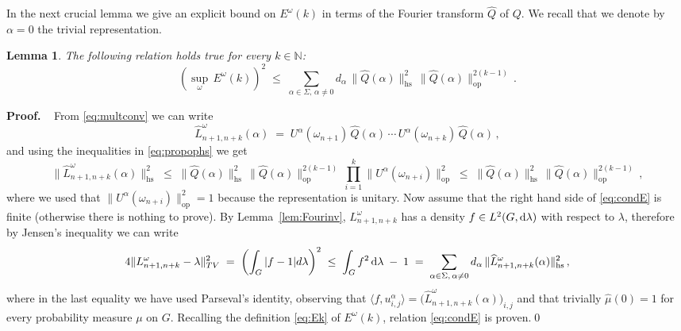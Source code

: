\documentclass[a4paper,reqno,11pt]{amsart}
\numberwithin{equation}{section}
\newtheorem{lemma}[theorem]{Lemma}
\newcommand{\ga}{\alpha}
\newcommand{\gl}{\lambda}
\newcommand{\go}{\omega}
\newcommand{\dd}{\text{\rm d}}             %
\newcommand{\N}{\mathbb{N}}
\def\proof{\noindent\textbf{Proof.} \ }
\newcommand{\somb}{\widehat} %
\begin{document}
In the next crucial lemma we give an explicit bound on $E^\go(k)$
in terms of the Fourier transform $\somb Q$ of $Q$.
We recall that we denote by $\ga = 0$ the trivial representation.

\smallskip
\begin{lemma} \label{lem:crucial}
The following relation holds true for every $k \in \N$:
\begin{equation} \label{eq:condE}
	\left( \sup_\go \, E^\go(k) \right)^2
	\;\le\; \sum_{\alpha \in \Sigma, \, \alpha \ne 0}
	d_{\alpha} \,  \|\somb Q(\alpha)\|_{\mathrm{hs}}^{2} \,
	\|\somb Q(\alpha)\|_{\mathrm{op}}^{2(k-1)} \,.
\end{equation}
\end{lemma}
\smallskip

\proof
From \eqref{eq:multconv} we can write
\begin{equation} \label{eq:mydec}
\somb L^\go_{n+1,n+k}(\alpha) \;=\;
U^\alpha(\go_{n+1}) \, \somb Q(\alpha) \,\cdots \,
U^\alpha(\go_{n+k}) \, \somb Q(\alpha)\,,
\end{equation}
and using the inequalities in \eqref{eq:propophs} we get
\begin{equation}
\|\somb L^\go_{n+1,n+k}(\alpha)\|^2_{\mathrm{hs}} \;\le\;
\|\somb Q(\alpha) \|^{2}_{\mathrm{hs}} \,
\|\somb Q(\alpha) \|^{2(k-1)}_{\mathrm{op}} \,
\prod_{i=1}^k \| U^\alpha(\omega_{n+i} ) \|^2_{\mathrm{op}}
\;\le\; \|\somb Q(\alpha) \|^{2}_{\mathrm{hs}} \,
\|\somb Q(\alpha) \|^{2(k-1)}_{\mathrm{op}} \,,
\end{equation}
where we used that $\| U^\alpha(\go_{n+i} )\|^2_{\mathrm{op}} = 1$
because the representation is unitary.
Now assume that the right hand side of \eqref{eq:condE} is finite
(otherwise there is nothing to prove). By Lemma~\ref{lem:Fourinv},
$L^\go_{n+1,n+k}$ has a density
$f \in L^2(G, \dd\gl)$ with respect to $\lambda$, therefore
by Jensen's inequality we can write
\begin{equation}
	4 \| L^\go_{n+1,n+k} - \lambda \|^2_{TV} \;=\;
	\left(\int_G |f-1| d\lambda\right)^2 \;\le\;
	\int_G f^2 \, \dd \gl \; - \; 1  \;=\;
	\sum_{\alpha \in \Sigma, \, \ga \ne 0} d_{\alpha} \,
	\|\somb L^\go_{n+1,n+k} (\alpha) \|^2_{\mathrm{hs}} \,,
\end{equation}
where in the last equality we have used Parseval's identity,
observing that $\langle f, u^\ga_{i,j} \rangle =
\big(\somb L^\go_{n+1,n+k} (\alpha)\big)_{i,j}$ and
that trivially $\somb \mu(0) = 1$ for every probability measure $\mu$
on $G$. Recalling the definition \eqref{eq:Ek} of $E^\go(k)$,
relation \eqref{eq:condE} is proven.\qed
\medskip
\end{document}
